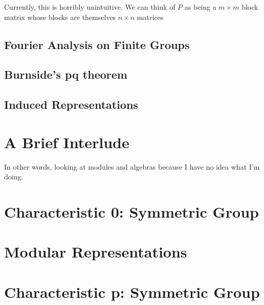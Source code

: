 \documentclass{article}
\begin{document}
\begin{note}
Currently, this is horribly unintuitive. We can think of $P$ as being a $m \times m$ block matrix whose blocks are themselves $n \times n$ matrices
\end{note}





\subsection{Fourier Analysis on Finite Groups}

\subsection{Burnside's pq theorem}

\subsection{Induced Representations}

\section{A Brief Interlude}
In other words, looking at modules and algebras because I have no idea what I'm doing.

\section{Characteristic 0: Symmetric Group}


\section{Modular Representations}

\section{Characteristic p: Symmetric Group}
\end{document}
